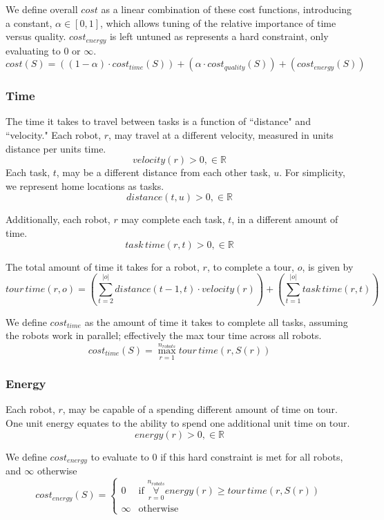 \documentclass[a4paper]{article}
\begin{document}
We define overall $\mathit{cost}$ as a linear combination of these cost functions, introducing a constant, $\alpha \in [0 ,1]$, which allows tuning of the relative importance of time versus quality. $\mathit{cost}_\mathit{energy}$ is left untuned as represents a hard constraint, only evaluating to $0$ or $\infty$.
$$
\mathit{cost}(S) =
  \left( (1-\alpha) \cdot \mathit{cost}_\mathit{time}(S) \right) +
  \left( \alpha \cdot \mathit{cost}_\mathit{quality}(S) \right) +
  \left( \mathit{cost}_\mathit{energy}(S) \right)
$$

\subsubsection{Time}

The time it takes to travel between tasks is a function of ``distance" and ``velocity." Each robot, $r$, may travel at a different velocity, measured in units distance per units time.
$$\mathit{velocity}(r) > 0, \in \mathbb{R}$$
Each task, $t$, may be a different distance from each other task, $u$. For simplicity, we represent home locations as tasks.
$$\mathit{distance}(t, u) > 0, \in \mathbb{R}$$

Additionally, each robot, $r$ may complete each task, $t$, in a different amount of time.
$$\mathit{task \, time}(r, t) > 0, \in \mathbb{R}$$

The total amount of time it takes for a robot, $r$, to complete a tour, $o$, is given by
$$
\mathit{tour \, time}(r, o) =
  \left(
    \sum^{|o|}_{t=2} \mathit{distance}(t - 1, t) \cdot \mathit{velocity}(r)
  \right) +
  \left(
    \sum^{|o|}_{t=1} \mathit{task \, time}(r, t)
  \right)
$$

We define $\mathit{cost}_\mathit{time}$ as the amount of time it takes to complete all tasks, assuming the robots work in parallel; effectively the max tour time across all robots.
$$
\mathit{cost}_\mathit{time}(S) =
  \max_{r=1}^{n_\mathit{robots}}
  \mathit{tour \, time}(r, S(r))
$$

\subsubsection{Energy}

Each robot, $r$, may be capable of a spending different amount of time on tour. One unit energy equates to the ability to spend one additional unit time on tour.
$$\mathit{energy}(r) > 0, \in \mathbb{R}$$

We define $\mathit{cost}_\mathit{energy}$ to evaluate to 0 if this hard constraint is met for all robots, and $\infty$ otherwise
$$
\mathit{cost}_\mathit{energy}(S) = \begin{cases}
0 & \text{if } \mathop{\forall}\limits_{r=0}^{n_\mathit{robots}} \mathit{energy}(r) \geq \mathit{tour \, time}(r, S(r)) \\
\infty & \text{otherwise}
\end{cases}
$$
\end{document}
